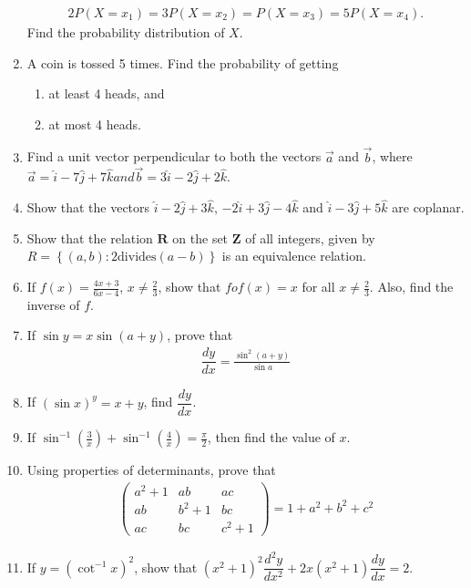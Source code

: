 \documentclass[10pt,-letter paper]{article}
\let\vec\mathbf{}
\let\vec\mathbf{}
\let\vec\mathbf{}
\providecommand{\cbrak}[1]{\ensuremath{\left\{#1\right\}}}
\providecommand{\brak}[1]{\ensuremath{\left(#1\right)}}
\newcommand{\myvec}[1]{\ensuremath{\begin{pmatrix}#1\end{pmatrix}}}
\begin{document}
\begin{enumerate}
\begin{align*}
		2P\brak{X = x_1} = 3P\brak{X = x_2} = P\brak{X = x_3} = 5P\brak{X = x_4}.
	\end{align*}
		Find the probability distribution of ${X}$.
\item A coin is tossed 5 times. Find the probability of getting 
	\begin{enumerate}[label = (\roman*)]
		\item at least 4 heads, and 
		\item at most 4 heads.
	\end{enumerate}
\item Find a unit vector perpendicular to both the vectors $\overrightarrow{a}$ and $\overrightarrow{b}$, where $\overrightarrow{a} = \hat{i} - 7\hat{j} + 7\hat{k} and \overrightarrow{b} = 3\hat{i} - 2\hat{j} + 2\hat{k}$.
\item Show that the vectors $\hat{i}-2\hat{j} +3\hat{k}$, $-2\hat{i}+3\hat{j}-4\hat{k}$ and $\hat{i}-3\hat{j}+5\hat{k}$ are coplanar.
\item Show that the relation $\vec{R}$ on the set $\vec{Z}$ of all integers, given by $R = \cbrak{\brak{a,b} :2 \text{divides} \brak{a-b}}$ is an equivalence relation.
\item If $f\brak{x}= \frac{4{x}+3}{6{x}-4}$, ${x}\neq\frac{2}{3}$, show that $fof\brak{x} = {x}$ for all ${x}\neq\frac{2}{3}$. Also, find the inverse of ${f}$.
\item If $\sin{y} = x\sin{\brak{a + y}}$, prove that 
	\begin{align*}
		\dfrac{dy}{dx} = \frac{\sin^{2}\brak{a + y}}{\sin{a}}
	\end{align*}
\item If $\brak{\sin x}^y = {x + y}$, find $\dfrac{dy}{dx}$.
\item If $\sin^{-1}\brak{\frac{3}{x}} + \sin^{-1}\brak{\frac{4}{x}} = \frac{\pi}{2}$, then find the value of $x$.
\item Using properties of determinants, prove that
	\begin{align*}
		\myvec{{a}^2 + {1} & {a}{b} & {a}{c} \\ {a}{b} & {b}^2+{1} & {b}{c} \\ {a}{c} & {b}{c} & {c}^2+{1}} = 1+{a}^2+{b}^2+{c}^2
	\end{align*}

\item If $y = \brak{\cot^{-1}{x}}^2$, show that $\brak{{x}^2+{1}}^2\dfrac{d^2y}{dx^2} + 2{x}\brak{{x^2}+{1}}\dfrac{dy}{dx} = 2$.


\end{enumerate}
\end{document}

